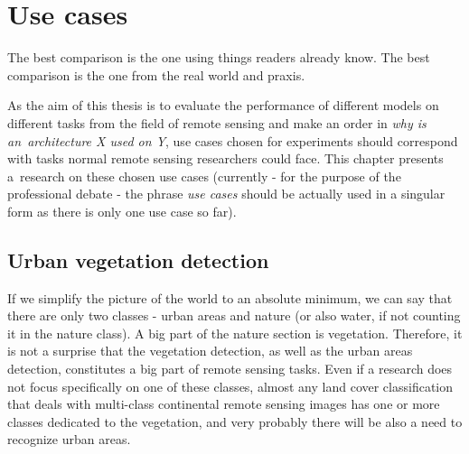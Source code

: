 \chapter{Use cases}
\label{use-cases}

The best comparison is the one using things readers already know. The best comparison is the one from the real world and praxis.

As the aim of this thesis is to evaluate the performance of different  models on different tasks from the field of remote sensing and make an order in \textit{why is an~architecture X used on Y}, use cases chosen for experiments should correspond with tasks normal remote sensing researchers could face. This chapter presents a~research on these chosen use cases (currently - for the purpose of the professional debate - the phrase \textit{use cases} should be actually used in a singular form as there is only one use case so far).

\section{Urban vegetation detection}
\label{urban-green}

If we simplify the picture of the world to an absolute minimum, we can say that there are only two classes - urban areas and nature (or also water, if not counting it in the nature class). A big part of the nature section is vegetation. Therefore, it is not a surprise that the vegetation detection, as well as the urban areas detection, constitutes a big part of remote sensing tasks. Even if a research does not focus specifically on one of these classes, almost any land cover classification that deals with multi-class continental remote sensing images has one or more classes dedicated to the vegetation, and very probably there will be also a need to recognize urban areas.

